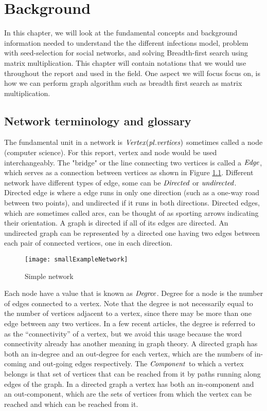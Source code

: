 \chapter{Background}

In this chapter, we will look at the fundamental concepts and background information needed to understand the the different infections model, problem with seed-selection for social networks, and solving Breadth-first search using matrix multiplication. This chapter will contain notations that we would use throughout the report and used in the field. One aspect we will focus focus on, is how we can perform graph algorithm such as breadth first search as matrix multiplication.


\section{Network terminology and glossary}
The fundamental unit in a network is $\it{{Vertex}} (pl. vertices)$ sometimes called a node (computer science). For this report, vertex and node would be used interchangeably. The "bridge" or the line connecting two vertices is called a $\it{{Edge}}$, which serves as a connection between vertices as shown in Figure \ref{fig:SimpleGraph}.  Different network have different types of edge, some can be $\it{Directed}$ or $\it{undirected}$. Directed edge is where a edge  runs in only one direction (such as a one-way road between two points), and undirected if it runs in both directions. Directed edges, which are sometimes called arcs, can be thought of as sporting arrows indicating their orientation. A graph is directed if all of its edges are directed. An undirected graph can be represented by a directed one having two edges between each pair of connected vertices, one in each direction.

\begin{figure}[!ht]
	\caption{Simple network} 
	\label{fig:SimpleGraph}
	\texttt{[image: smallExampleNetwork]}
\end{figure}


Each node have a value that is known as $\it{{Degree}}$. Degree for a node is the number of edges connected to a vertex. Note that the degree is not necessarily equal to the number of vertices adjacent to a vertex, since there may be more than one edge between any two vertices. In a few recent articles, the degree is referred to as the “connectivity” of a vertex, but we avoid this usage because the word connectivity already has another meaning in graph theory. A directed graph has both an in-degree and an out-degree for each vertex, which are the numbers of in-coming and out-going edges respectively. The $\it{{Component}}$ to which a vertex belongs is that set of vertices that can be reached from it by paths running along edges of the graph. In a directed graph a vertex has both an in-component and an out-component, which are the sets of vertices from which the vertex can be reached and which can be reached from it.

